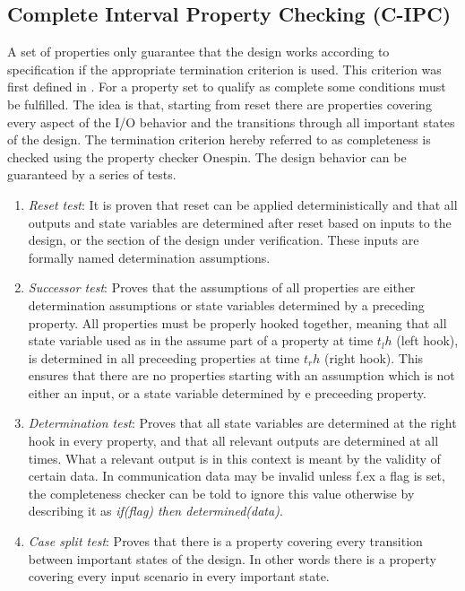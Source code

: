 \subsection{Complete Interval Property Checking (C-IPC)}
\label{sub:cipc}
A set of properties only guarantee that the design works according to specification if the appropriate termination criterion is used. This criterion was first defined in \cite{bormannbusch}. For a property set to qualify as complete some conditions must be fulfilled. The idea is that, starting from reset there are properties covering every aspect of the I/O behavior and the transitions through all important states of the design. The termination criterion hereby referred to as completeness is checked using the property checker Onespin. The design behavior can be guaranteed by a series of tests.
\begin{enumerate}
 \item \textit{Reset test}: It is proven that reset can be applied deterministically and that all outputs and state variables are determined after reset based on inputs to the design, or the section of the design under verification. These inputs are formally named determination assumptions.  
 \item \textit{Successor test}: Proves that the assumptions of all properties are either determination assumptions or state variables determined by a preceding property. All properties must be properly hooked together, meaning that all state variable used as in the assume part of a property at time $t_lh$ (left hook), is determined in all preceeding properties at time $t_rh$ (right hook). This ensures that there are no properties starting with an assumption which is not either an input, or a state variable determined by e preceeding property.
 \item \textit{Determination test}: Proves that all state variables are determined at the right hook in every property, and that all relevant outputs are determined at all times. What a relevant output is in this context is meant by the validity of certain data. In communication data may be invalid unless f.ex a flag is set, the completeness checker can be told to ignore this value otherwise by describing it as \textit{if(flag) then determined(data)}.
 \item \textit{Case split test}: Proves that there is a property covering every transition between important states of the design. In other words there is a property covering every input scenario in every important state. 
\end{enumerate}

